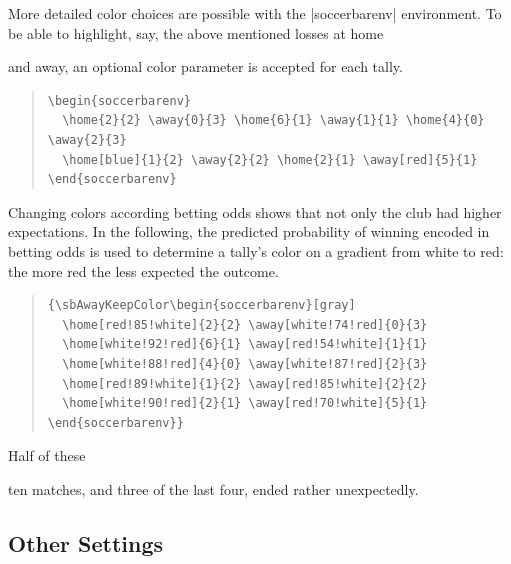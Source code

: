\documentclass[a4paper,12pt]{ltxdoc}
\begin{document}
More detailed color choices are possible with the |soccerbarenv| environment. 
To be able to highlight, say, the above mentioned losses {\color{bayernblau}at home} 
\begin{soccerbarenv}
       
   
\end{soccerbarenv}
and {\color{fcbayern}away}, an optional color parameter is accepted for each tally.
\begin{quote}
  \begin{verbatim}
\begin{soccerbarenv}
  \home{2}{2} \away{0}{3} \home{6}{1} \away{1}{1} \home{4}{0} \away{2}{3}
  \home[blue]{1}{2} \away{2}{2} \home{2}{1} \away[red]{5}{1}
\end{soccerbarenv}\end{verbatim}
\end{quote}
Changing colors according betting odds
shows that not only the club had higher expectations.
In the following, 
the predicted probability of winning encoded in betting odds 
is used to determine a tally's color on a gradient from white to red:
the more red the less expected the outcome.
\begin{quote}
  \begin{verbatim}
{\sbAwayKeepColor\begin{soccerbarenv}[gray]
  \home[red!85!white]{2}{2} \away[white!74!red]{0}{3}
  \home[white!92!red]{6}{1} \away[red!54!white]{1}{1}
  \home[white!88!red]{4}{0} \away[white!87!red]{2}{3}
  \home[red!89!white]{1}{2} \away[red!85!white]{2}{2}
  \home[white!90!red]{2}{1} \away[red!70!white]{5}{1}
\end{soccerbarenv}}\end{verbatim}
\end{quote}
Half of these
{\sbAwayKeepColor\begin{soccerbarenv}[gray]
\end{soccerbarenv}}
ten matches, and three of the last four, ended rather unexpectedly.

\clearpage
\subsection{Other Settings}\label{sec:settings}
\end{document}
